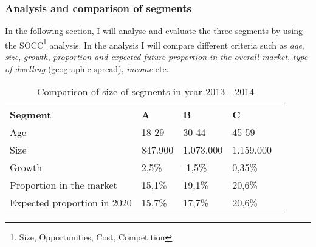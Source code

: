 \subsubsection{Analysis and comparison of segments}
In the following section, I will analyse and evaluate the three segments by using the SOCC\footnote{Size, Opportunities, Cost, Competition} analysis. In the analysis I will compare different criteria such as \textit{age}, \textit{size}, \textit{growth}, \textit{proportion and expected future proportion in the overall market}, \textit{type of dwelling} (geographic spread), \textit{income} etc.

\begin{table}[H]
\centering
\caption{Comparison of size of segments in year 2013 - 2014 \cite[15-18]{ConsumerLifestyles}}
\label{SegmentsTable}
\begin{tabular}{l|llll}
\textbf{Segment}        & \textbf{A}   & \textbf{B}     & \textbf{C}    &  \\ \cline{1-5}
Age                         & 18-29   & 30-44     & 45-59     &  \\
Size                        & 847.900 & 1.073.000 & 1.159.000 &  \\
Growth                      & 2,5\%   & -1,5\%    & 0,35\%    &  \\
Proportion in the market    & 15,1\%  & 19,1\%    & 20,6\%    &  \\
Expected proportion in 2020 & 15,7\%  & 17,7\%    & 20,6\%    & 
\end{tabular}
\end{table}

